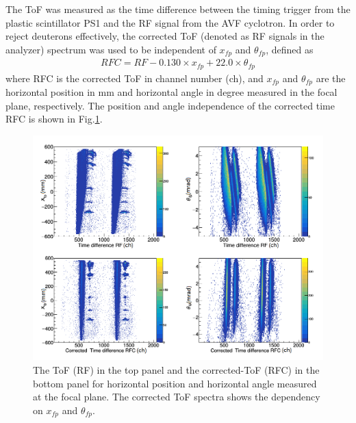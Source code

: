 The ToF was measured as the time difference between the timing trigger from the plastic scintillator PS1 and the RF signal from the AVF cyclotron. In order to reject deuterons effectively, the corrected  ToF (denoted as RF signals in the analyzer) spectrum was used to be independent of $x_{fp}$ and $\theta_{fp}$, defined as
\begin{equation}
    \label{eq:RFC}
    \begin{aligned}
    RFC = RF - 0.130 \times x_{fp} + 22.0 \times \theta_{fp}
    \end{aligned}
\end{equation}
where RFC is the corrected ToF in channel number (ch), and $x_{fp}$ and $\theta_{fp}$ are the horizontal position in mm and horizontal angle in degree measured in the focal plane, respectively. The position and angle independence of the corrected time RFC is shown in Fig.\ref{fig:RFC}.
\begin{figure}[tpb]
  \begin{center}
    \centerline{\includegraphics[scale=0.6]{graph/ch4/RFC}}
    \caption{The ToF (RF) in  the top panel and the corrected-ToF (RFC) in the bottom panel for horizontal position and horizontal angle measured at the focal plane. The corrected ToF spectra shows  the dependency on  $x_{fp}$ and $\theta_{fp}$.}
    \label{fig:RFC}
  \end{center}
\end{figure}

